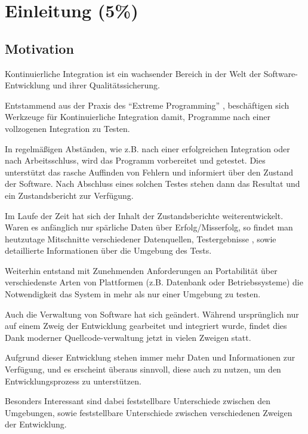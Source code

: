 \chapter{Einleitung (5\%) }

\section{Motivation}

Kontinuierliche Integration ist ein wachsender Bereich
in der Welt der Software-Entwicklung und ihrer Qualitätssicherung.

Entstammend aus der Praxis des ``Extreme Programming''
\cite{xp:explained, folwer:xp},
beschäftigen sich Werkzeuge für Kontinuierliche Integration damit,
Programme nach einer vollzogenen Integration zu Testen.

In regelmäßigen Abständen, wie z.B. nach einer erfolgreichen Integration oder nach Arbeitsschluss,
wird das Programm vorbereitet und getestet.
Dies unterst\"utzt das rasche Auffinden von Fehlern
und informiert \"uber den Zustand der Software.
Nach Abschluss eines solchen Testes stehen dann das Resultat
und ein Zustandsbericht zur Verf\"ugung.

Im Laufe der Zeit hat sich der Inhalt der Zustandsberichte weiterentwickelt.
Waren es anf\"anglich nur sp\"arliche Daten \"uber Erfolg/Misserfolg,
so findet man heutzutage Mitschnitte verschiedener Datenquellen, Testergebnisse
\cite{jenkins:junitxml}, sowie detaillierte Informationen \"uber die Umgebung des Tests.

Weiterhin entstand mit Zunehmenden Anforderungen an Portabilit\"at \"uber
verschiedenste Arten von Plattformen (z.B. Datenbank oder Betriebssysteme)
die Notwendigkeit das System in mehr als nur einer Umgebung zu testen.

Auch die Verwaltung von Software hat sich ge\"andert.
Während ursprünglich nur auf einem Zweig der Entwicklung gearbeitet und integriert wurde,
findet dies Dank moderner Quellcode-verwaltung jetzt in vielen Zweigen statt.
\cite{dvcs:vorteile, dvcs:entwicklungsmodelle}

Aufgrund dieser Entwicklung stehen immer mehr Daten und Informationen zur Verfügung,
und es erscheint überaus sinnvoll, diese auch zu nutzen, um den Entwicklungsprozess zu unterstützen.

Besonders Interessant sind dabei feststellbare Unterschiede zwischen den Umgebungen,
sowie feststellbare Unterschiede zwischen verschiedenen Zweigen der Entwicklung.

